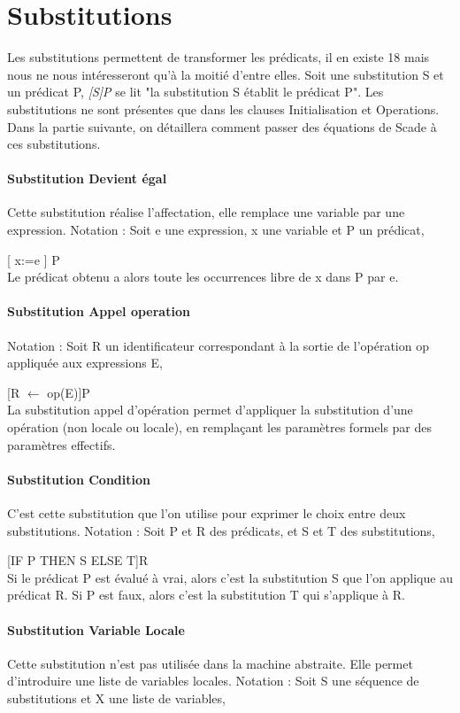 
\section{Substitutions}
Les substitutions permettent de transformer les prédicats, il en existe 18 mais
nous ne nous intéresseront qu'à la moitié d'entre elles. Soit une substitution S et un
prédicat P, \emph{[S]P} se lit "la substitution S établit le prédicat P".
Les substitutions ne sont présentes que dans les clauses Initialisation et
Operations. Dans la partie suivante, on détaillera comment passer des équations
de Scade à ces substitutions.


\paragraph{Substitution Devient égal}
Cette substitution réalise l'affectation, elle remplace une variable
par une expression. Notation : Soit e une expression, x une
variable et P un prédicat,

[ x:=e ] P \\
Le prédicat obtenu a alors toute les occurrences libre de x dans P par e.

\paragraph{Substitution Appel operation}
Notation : Soit R un identificateur correspondant à la sortie
de l'opération op appliquée aux expressions E, 

[R $\leftarrow$ op(E)]P\\
La  substitution appel d’opération permet d’appliquer la substitution
d’une opération (non locale ou locale), en remplaçant les paramètres
formels par des paramètres effectifs. 

\paragraph{Substitution Condition}
C'est cette substitution que l'on utilise pour exprimer le choix entre deux
substitutions. Notation : Soit P et R des prédicats, et S et T des
substitutions,

[IF P THEN S ELSE T]R \\
Si le prédicat P est évalué à vrai, alors c'est la substitution S que l'on
applique au prédicat R. Si P est faux, alors c'est la substitution T qui
s'applique à R.

\paragraph{Substitution Variable Locale}
Cette substitution n'est pas utilisée dans la machine abstraite. Elle permet
d'introduire une liste de variables locales.
Notation : Soit S une séquence de substitutions et X une liste de variables,

